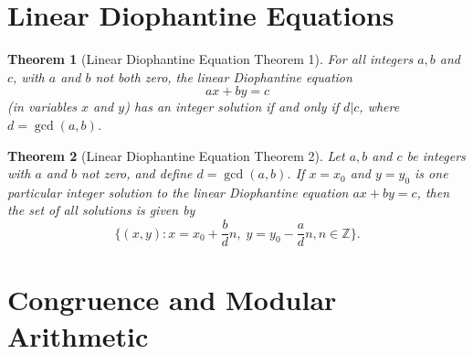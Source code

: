 \documentclass[10pt]{article}
\theoremstyle{break}
\newtheorem{thm}{Theorem}[subsection]
\begin{document}
\newpage 


\section{Linear Diophantine Equations}

\begin{thm}[Linear Diophantine Equation Theorem 1]
For all integers $a, b$ and $c$, with $a$ and $b$ not both zero, the linear Diophantine equation $$ax + by = c$$
(in variables $x$ and $y$) has an integer solution if and only if $d |c$, where $d = \gcd(a, b)$.
\end{thm}

\begin{thm}[Linear Diophantine Equation Theorem 2]
Let $a, b$ and $c$ be integers with $a$ and $b$ not zero, and define $d = \gcd(a,b)$. If $x = x_0$ and $y = y_0$ is one particular integer solution to the linear Diophantine equation $ax + by = c$, then the set of all solutions is given by
$$\{(x, y): x = x_0 + \frac{b}{d}n, \; y=y_0 - \frac{a}{d}n, n \in \mathbb{Z}\}.$$
\end{thm}

\newpage

\section{Congruence and Modular Arithmetic}
\end{document}
